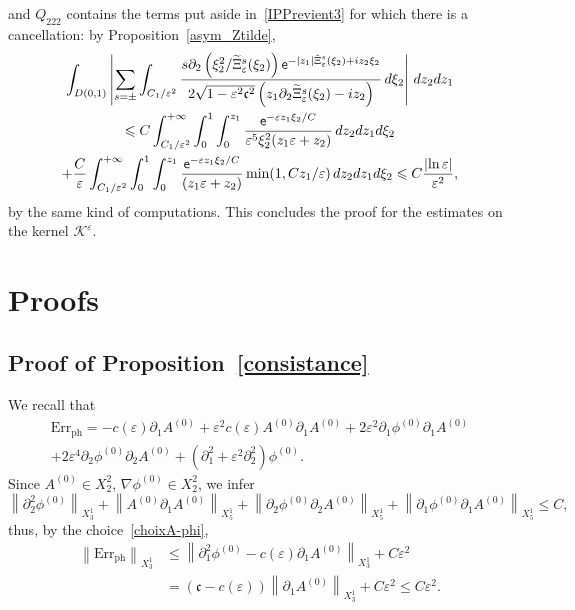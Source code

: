 \documentclass[AHL,Unicode,longabstracts,published]{cedram}
\newcommand*\p{\partial}
\newcommand{\phl}{\mathrm{ph}}
\newcommand{\Err}{\mathrm{Err}}
\newcommand*\BK{\mathcal{K}}
\newcommand*\ex{{\sf e}}
\newcommand*\cs{{\mathfrak c}}
\newcommand*\ii{\infty}
\newcommand*\ls{\leqslant }
\newcommand*\e{\varepsilon}
\renewcommand*\t{\tilde}
\let\oldtilde\tilde
\renewcommand*{\tilde}[1]{\mathchoice{\widetilde{#1}}{\widetilde{#1}}{\oldtilde{#1}}{\oldtilde{#1}}}
\begin{document}
and $ Q_{222} $ contains the terms put aside in~\eqref{IPPrevient3} for which there is a cancellation: by Proposition~\ref{asym_Ztilde},
\begin{multline*}
\int_{D(0,1)} \left\lvert \sum_{s =\pm } \int_{C_1/\e^2}
\frac{ s \p_2 \left(\xi_2^2 / \t\Xi_\e^s (\xi_2)\right) \ex^{- |z_1| \t\Xi_\e^s (\xi_2) + i z_2 \xi_2} }{ 2 \sqrt{ 1 - \e^2 \cs^2 } \left(z_1 \p_2 \t\Xi_\e^s (\xi_2) - i z_2\right) } \, d\xi_2 \right\rvert \, dz_2 dz_1
\\ 
\ls C \int_{ C_1 / \e^{2} }^{+\ii} \int_0^1 \int_0^{z_1}
\frac{ \ex^{- \e z_1 \xi_2 /C } }{ \e^5 \xi_2^2 (z_1 \e + z_2) } \, dz_2 dz_1 d\xi_2
\\+ \frac{C}{\e} \int_{ C_1 / \e^{2} }^{+\ii} \int_0^1 \int_0^{z_1}
\frac{ \ex^{- \e z_1 \xi_2 /C } }{ (z_1 \e + z_2) } \min (1, Cz_1 / \e) \, dz_2 dz_1 d\xi_2
\ls C \frac{ \lvert \ln \e \rvert }{ \e^2 },
\end{multline*}
by the same kind of computations. This concludes the proof for the estimates on the kernel $ \BK^\e $.



\section{Proofs}


\subsection{Proof of Proposition~\ref{consistance}}

We recall that
\begin{multline*}
\Err_{\phl}  = - c(\e) \p_{1} A^{(0)} + \e^2 c (\e) A^{(0)} \p_{1} A^{(0)} + 2 \e^2 \p_{1} \phi^{(0)} \p_{1} A^{(0)}
\\ + 2 \e^4 \p_{2} \phi^{(0)} \p_{2} A^{(0)} + \left(\p_{1}^2 + \e^2 \p^2_{2}\right) \phi^{(0)}.
\end{multline*}
Since $ A^{(0)} \in X^2_{2 } $, $ \nabla \phi^{(0)} \in X^2_{2 } $, we infer
\[
\left\| \p^2_{2} \phi^{(0)}\right\|_{ X^1_{3}} + \left\| A^{(0)} \p_{1} A^{(0)}\right\|_{ X^1_5 } + \left\| \p_{2} \phi^{(0)} \p_{2} A^{(0)}\right\|_{ X^1_5 } + \left\| \p_{1} \phi^{(0)} \p_{1} A^{(0)}\right\|_{ X^1_5 }
\ls C,
\]
thus, by the choice~\eqref{choixA-phi},
\begin{align*}
\left\| \Err_{\phl}\right\|_{ X^1_3 } & \ls \left\| \p_{1}^2 \phi^{(0)} - c(\e) \p_{1} A^{(0)} \right\|_{ X^1_3 } + C \e^2
\\ & = (\cs - c(\e)) \left\| \p_{1} A^{(0)}\right\|_{ X^1_3 } + C \e^2
\ls C \e^2.
\end{align*}
\end{document}

